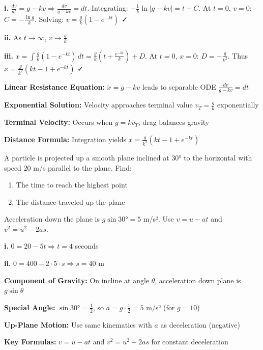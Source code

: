 \begin{solution}
\textbf{i.} $\frac{dv}{dt} = g - kv \Rightarrow \frac{dv}{g-kv} = dt$. Integrating: $-\frac{1}{k}\ln|g-kv| = t + C$. At $t=0$, $v=0$: $C = -\frac{\ln g}{k}$. Solving: $v = \frac{g}{k}(1-e^{-kt})$ ✓

\textbf{ii.} As $t \to \infty$, $v \to \frac{g}{k}$

\textbf{iii.} $x = \int \frac{g}{k}(1-e^{-kt})\,dt = \frac{g}{k}\left(t + \frac{e^{-kt}}{k}\right) + D$. At $t=0$, $x=0$: $D = -\frac{g}{k^2}$. Thus $x = \frac{g}{k^2}(kt - 1 + e^{-kt})$ ✓
\end{solution}

\begin{takeaways}
\item \textbf{Linear Resistance Equation:} $\ddot{x} = g - kv$ leads to separable ODE $\frac{dv}{g-kv} = dt$
\item \textbf{Exponential Solution:} Velocity approaches terminal value $v_T = \frac{g}{k}$ exponentially
\item \textbf{Terminal Velocity:} Occurs when $g = kv_T$; drag balances gravity
\item \textbf{Distance Formula:} Integration yields $x = \frac{g}{k^2}(kt - 1 + e^{-kt})$
\end{takeaways}

\begin{problem}
A particle is projected up a smooth plane inclined at $30°$ to the horizontal with speed 20 m/s parallel to the plane. Find:
\begin{enumerate}[label=\textbf{\roman*.}]
    \item The time to reach the highest point
    \item The distance traveled up the plane
\end{enumerate}
\end{problem}

\begin{hint}
Acceleration down the plane is $g\sin 30° = 5$ m/s². Use $v = u - at$ and $v^2 = u^2 - 2as$.
\end{hint}

\begin{solution}
\textbf{i.} $0 = 20 - 5t \Rightarrow t = 4$ seconds

\textbf{ii.} $0 = 400 - 2 \cdot 5 \cdot s \Rightarrow s = 40$ m
\end{solution}

\begin{takeaways}
\item \textbf{Component of Gravity:} On incline at angle $\theta$, acceleration down plane is $g\sin\theta$
\item \textbf{Special Angle:} $\sin 30° = \frac{1}{2}$, so $a = g \cdot \frac{1}{2} = 5$ m/s² (for $g = 10$)
\item \textbf{Up-Plane Motion:} Use same kinematics with $a$ as deceleration (negative)
\item \textbf{Key Formulas:} $v = u - at$ and $v^2 = u^2 - 2as$ for constant deceleration
\end{takeaways}

